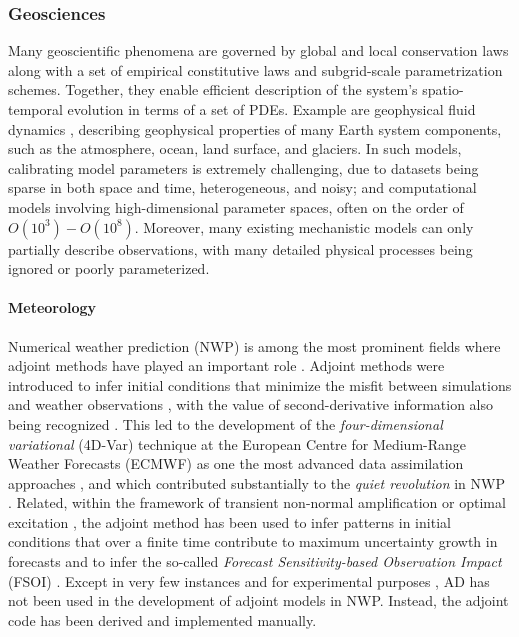 \subsubsection{Geosciences}

Many geoscientific phenomena are governed by global and local conservation laws along with a set of empirical constitutive laws and subgrid-scale parametrization schemes. 
Together, they enable efficient description of the system's spatio-temporal evolution in terms of a set of PDEs.
Example are geophysical fluid dynamics \cite{Vallis:2016kv}, describing geophysical properties of many Earth system components, such as the atmosphere, ocean, land surface, and glaciers.
In such models, calibrating model parameters is extremely challenging, due to datasets being sparse in both space and time, heterogeneous, and noisy; and computational models involving high-dimensional parameter spaces, often on the order of $O(10^3) - O(10^8)$.
Moreover, many existing mechanistic models can only partially describe observations, with many detailed physical processes being ignored or poorly parameterized. 


\paragraph{Meteorology}
\label{section:meteorlogy}

Numerical weather prediction (NWP) is among the most prominent fields where adjoint methods have played an important role \cite{Errico_1997}. 
Adjoint methods were introduced to infer initial conditions that minimize the misfit between simulations and weather observations \cite{Talagrand.1987,Courtier.1987}, with the value of second-derivative information also being recognized \cite{Dimet.2002}. 
This led to the development of the \textit{four-dimensional variational} (4D-Var) technique at the European Centre for Medium-Range Weather Forecasts (ECMWF) as one the most advanced data assimilation approaches \cite{Rabier.1992,Rabier:2000uu}, and which contributed substantially to the \textit{quiet revolution} in NWP \cite{Bauer.2015}.
Related, within the framework of transient non-normal amplification or optimal excitation \cite{Farrell.1988,Farrell:1996jx}, the adjoint method has been used to infer patterns in initial conditions that over a finite time contribute to maximum uncertainty growth in forecasts \cite{Palmer:1994br,Buizza:1995in} and to infer the so-called \textit{Forecast Sensitivity-based Observation Impact} (FSOI) \cite{Langland:2004jo}.
Except in very few instances and for experimental purposes \cite{Giering.2006}, AD has not been used in the development of adjoint models in NWP.
Instead, the adjoint code has been derived and implemented manually.

